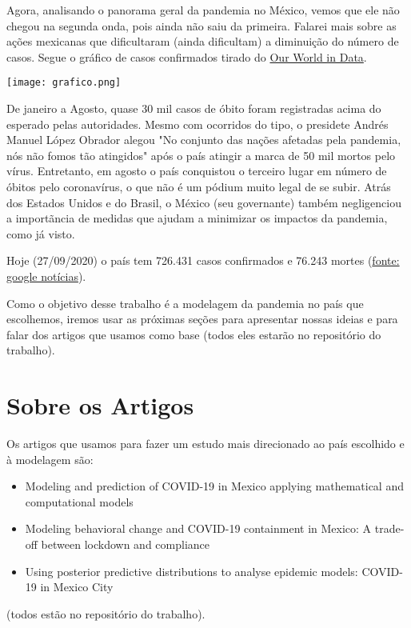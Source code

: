 \documentclass{article}
\begin{document}
Agora, analisando o panorama geral da pandemia no México, vemos que ele não chegou na segunda onda, pois ainda não saiu da primeira. Falarei mais sobre as ações mexicanas que dificultaram (ainda dificultam) a diminuição do número de casos. Segue o gráfico de casos confirmados tirado do \href{https://ourworldindata.org/coronavirus}{Our World in Data}. 

\texttt{[image: grafico.png]}

De janeiro a Agosto, quase 30 mil casos de óbito foram registradas acima do esperado pelas autoridades. Mesmo com ocorridos do tipo, o presidete Andrés Manuel López Obrador alegou "No conjunto das nações afetadas pela pandemia, nós não fomos tão atingidos" após o país atingir a marca de 50 mil mortos pelo vírus. Entretanto, em agosto o país conquistou o terceiro lugar em número de óbitos pelo coronavírus, o que não é um pódium muito legal de se subir. Atrás dos Estados Unidos e do Brasil, o México (seu governante) também negligenciou a importãncia de medidas que ajudam a minimizar os impactos da pandemia, como já visto. 

Hoje (27/09/2020) o país tem 726.431 casos confirmados e 76.243 mortes (\href{https://news.google.com/covid19/map?hl=pt-PT&mid=\%2Fm\%2F0b90_r&gl=PT&ceid=PT\%3Apt-150}{fonte: google notícias}).

Como o objetivo desse trabalho é a modelagem da pandemia no país que escolhemos, iremos usar as próximas seções para apresentar nossas ideias e para falar dos artigos que usamos como base (todos eles estarão no repositório do trabalho).

\section{Sobre os Artigos}

Os artigos que usamos para fazer um estudo mais direcionado ao país escolhido e à modelagem são: 

\begin{itemize}
    \item Modeling and prediction of COVID-19 in Mexico applying
mathematical and computational models
    \item Modeling behavioral change and COVID-19 containment in Mexico: A trade-off between lockdown and compliance
    \item Using posterior predictive distributions to analyse
epidemic models: COVID-19 in Mexico City
\end{itemize}
(todos estão no repositório do trabalho).
\end{document}

